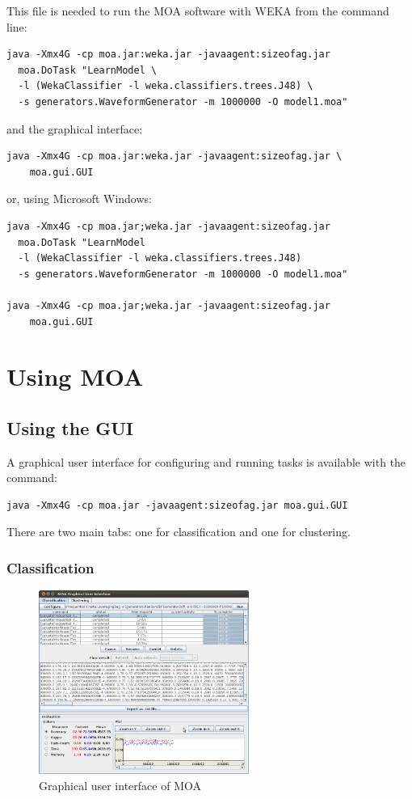 \documentclass[a4paper,12pt,twoside]{book}
\begin{document}
This file is needed to run the MOA software with WEKA from the command line:
\begin{verbatim}
java -Xmx4G -cp moa.jar:weka.jar -javaagent:sizeofag.jar 
  moa.DoTask "LearnModel \
  -l (WekaClassifier -l weka.classifiers.trees.J48) \ 
  -s generators.WaveformGenerator -m 1000000 -O model1.moa"
\end{verbatim}
and the graphical interface:
\begin{verbatim}
java -Xmx4G -cp moa.jar:weka.jar -javaagent:sizeofag.jar \
    moa.gui.GUI
\end{verbatim}
or, using Microsoft Windows:
\begin{verbatim}
java -Xmx4G -cp moa.jar;weka.jar -javaagent:sizeofag.jar
  moa.DoTask "LearnModel 
  -l (WekaClassifier -l weka.classifiers.trees.J48)                  
  -s generators.WaveformGenerator -m 1000000 -O model1.moa"

java -Xmx4G -cp moa.jar;weka.jar -javaagent:sizeofag.jar 
    moa.gui.GUI
\end{verbatim}


\chapter{Using MOA}
\section{Using the GUI}
A graphical user interface for configuring and running tasks is available with the command:

\begin{verbatim}
java -Xmx4G -cp moa.jar -javaagent:sizeofag.jar moa.gui.GUI
\end{verbatim}

There are two main tabs: one for classification and one for clustering.

\subsection{Classification}

\begin{figure}[ht]
\begin{center}
\includegraphics[height=6cm]{figures/MOA_Task.png}\end{center}
\caption{Graphical user interface of MOA}
\end{figure}
\end{document}
